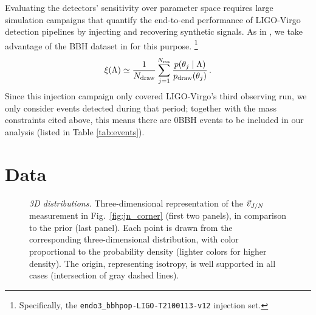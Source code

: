 \documentclass[twocolumn,twocolappendix,linenumbers]{aastex631}
\newcommand{\Nevents}{0}
\begin{document}
Evaluating the detectors' sensitivity over parameter space requires large simulation campaigns that quantify the end-to-end performance of LIGO-Virgo detection pipelines by injecting and recovering synthetic signals.
As in \citet{Essick:2022slj}, we take advantage of the \ac{BBH} dataset in \citet{o3-selection} for this purpose.%
\footnote{Specifically, the \texttt{endo3\_bbhpop-LIGO-T2100113-v12} injection set.}
\begin{equation}
  \xi(\Lambda) \simeq \frac{1}{N_{\rm draw}} \sum^{N_{\rm rec}}_{j=1} \frac{p(\theta_j \mid \Lambda)}{p_{\rm draw}(\theta_j)}\, .
\end{equation}
Since this injection campaign only covered LIGO-Virgo's third observing run, we only consider events detected during that period; together with the mass constraints cited above, this means there are \Nevents \ac{BBH} events to be included in our analysis (listed in Table \ref{tab:events}). 

\section{Data}
\label{sec:data}

\setlength{\tabcolsep}{4pt}

\begin{nolinenumbers}
\begin{figure*}[hbt]
%
%
\caption{\emph{3D distributions.} Three-dimensional representation of the $\vec{v}_{J/N}$ measurement in Fig.~\ref{fig:jn_corner} (first two panels), in comparison to the prior (last panel).
Each point is drawn from the corresponding three-dimensional distribution, with color proportional to the probability density (lighter colors for higher density).
The origin, representing isotropy, is well supported in all cases (intersection of gray dashed lines).
\protect{}
}
\label{fig:density_3d}
\end{figure*}
\end{nolinenumbers}
\end{document}
